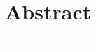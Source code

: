 \chapter*{Abstract}

\begin{flushright}
    \textit{\DerAutorDerArbeit - \DieMatrikelnummer - \DieKursbezeichnung}
\end{flushright}

\textbf{\DerTitelDerArbeitEnglisch}
